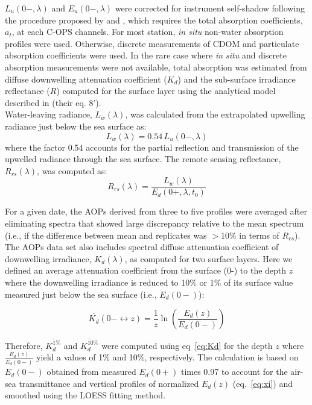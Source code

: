 \documentclass[essd, manuscript]{copernicus}
\begin{document}
$L_u(0-,\lambda)$ and $E_u(0-,\lambda)$ were corrected for instrument self-shadow following the procedure proposed by \citet{Gordon1992b} and \citet{Zibordi1995}, which requires the total absorption coefficients, $a_t$, at each C-OPS channels. For most station, \textit{in situ} non-water absorption profiles were used. Otherwise, discrete measurements of CDOM and particulate absorption coefficients were used. In the rare case where \textit{in situ} and discrete absorption measurements were not available, total absorption was estimated from diffuse downwelling attenuation coefficient ($K_d$) and the sub-surface irradiance reflectance ($R$) computed for the surface layer using the analytical model described in \citet{Morel2001} (their eq. 8').\\ 
Water-leaving radiance, $L_w(\lambda)$, was calculated from the extrapolated upwelling radiance just below the sea surface as:
 \begin{equation}
 \label{eq:L_w}
L_w(\lambda) = 0.54\,L_u(0-,\lambda)
\end{equation}
where the factor 0.54 accounts for the partial reflection and transmission of the upwelled radiance through the sea surface. 
The remote sensing reflectance, $R_{rs}(\lambda)$, was computed as:
 \begin{equation}
 \label{eq:Rrs}
R_{rs}(\lambda) = \frac{L_w(\lambda)}{E_d(0+,\lambda,t_0)} 
\end{equation}

For a given date, the AOPs derived from three to five profiles were averaged after eliminating spectra that showed large discrepancy relative to the mean spectrum (i.e., if the difference between mean and replicates was $>$10\% in terms of $R_{rs}$).\\  

The AOPs data set also includes spectral diffuse attenuation coefficient of downwelling irradiance, $K_d(\lambda)$, as computed for two surface layers. Here we defined an average attenuation coefficient from the surface (0-) to the depth $z$ where the downwelling irradiance is reduced to 10\% or 1\% of its surface value measured just below the sea surface (i.e., $E_d(0-)$):  

\begin{equation}
    \overline{K_d}(0- \leftrightarrow z) = \frac{1}{z}\ln \left( \frac{E_d(z)}{E_d(0-)} \right)
    \label{eq:Kd}
\end{equation}

Therefore, $\overline{K_d^{1\%}}$ and $\overline{K_d^{10\%}}$ were computed using eq~\ref{eq:Kd} for the depth $z$ where $\frac{E_d(z)}{E_d(0-)}$ yield a values of 1\% and 10\%, respectively. The calculation is based on $E_d(0-)$ obtained from measured $E_d(0+)$ times 0.97 to account for the air-sea transmittance \citep{Mueller2003vIII} and vertical profiles of normalized $E_d(z)$ (eq.~\ref{eq:xi}) and smoothed using the LOESS fitting method. \\ 
\end{document}
